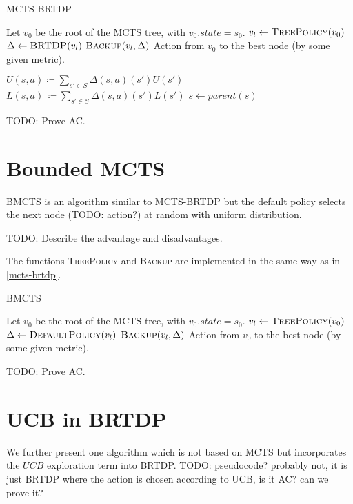 \begin{algorithm}
\caption{MCTS-BRTDP}
\label{mcts-brtdp}
\begin{algorithmic}
    \State Let $v_0$ be the root of the MCTS tree, with $v_0.state = s_0$.
        \State $v_l \gets \Call{TreePolicy}{v_0}$
        \State $\Delta \gets \Call{BRTDP}{v_l}$
        \State $\Call{Backup}{v_l, \Delta}$
    \EndWhile
    \State \Return Action from $v_0$ to the best node (by some
    given metric).
\EndFunction

\Repeat
{}
\EndFunction

\Repeat
    \State $U(s,a) \coloneqq \sum_{s' \in S} \Delta(s,a)(s')U(s')$
    \State $L(s,a)\, \coloneqq \sum_{s' \in S} \Delta(s,a)(s')L(s')$
    \State $s \gets parent(s)$
\EndFunction
\end{algorithmic}
\end{algorithm}

TODO: Prove AC.

\section{Bounded MCTS}

BMCTS is an algorithm similar to MCTS-BRTDP but the default policy
selects the next node (TODO: action?) at random with uniform
distribution.

TODO: Describe the advantage and disadvantages.

The functions \textsc{TreePolicy} and \textsc{Backup} are implemented in
the same way as in \autoref{mcts-brtdp}.

\begin{algorithm}
\caption{BMCTS}
\label{bmcts}
\begin{algorithmic}
    \State Let $v_0$ be the root of the MCTS tree, with $v_0.state = s_0$.
        \State $v_l \gets \Call{TreePolicy}{v_0}$
        \State $\Delta \gets \Call{DefaultPolicy}{v_l}$
        \State $\Call{Backup}{v_l, \Delta}$
    \EndWhile
    \State \Return Action from $v_0$ to the best node (by some
    given metric).
\EndFunction

\EndFunction

\end{algorithmic}
\end{algorithm}


TODO: Prove AC.


\section{UCB in BRTDP}

We further present one algorithm which is not based on MCTS but
incorporates the $UCB$ exploration term into BRTDP. TODO: pseudocode?
probably not, it is just BRTDP where the action is chosen according to
UCB, is it AC? can we prove it?
